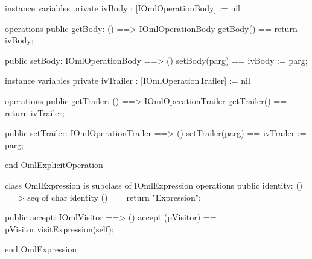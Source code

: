 \begin{vdm_al}
instance variables
  private ivBody : [IOmlOperationBody] := nil

operations
  public getBody: () ==> IOmlOperationBody
  getBody() == return ivBody;

  public setBody: IOmlOperationBody ==> ()
  setBody(parg) == ivBody := parg;

instance variables
  private ivTrailer : [IOmlOperationTrailer] := nil

operations
  public getTrailer: () ==> IOmlOperationTrailer
  getTrailer() == return ivTrailer;

  public setTrailer: IOmlOperationTrailer ==> ()
  setTrailer(parg) == ivTrailer := parg;

end OmlExplicitOperation
\end{vdm_al}

\begin{vdm_al}
class OmlExpression is subclass of IOmlExpression
operations
  public identity: () ==> seq of char
  identity () == return "Expression";

  public accept: IOmlVisitor ==> ()
  accept (pVisitor) == pVisitor.visitExpression(self);

end OmlExpression
\end{vdm_al}
